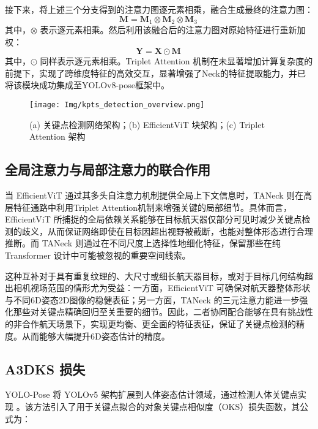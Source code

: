 接下来，将上述三个分支得到的注意力图逐元素相乘，融合生成最终的注意力图：
\begin{equation} 
	\mathbf{M} = \mathbf{M}_{1} \otimes \mathbf{M}_{2} \otimes \mathbf{M}_{3}\,
\end{equation}
其中，$\otimes$ 表示逐元素相乘。然后利用该融合后的注意力图对原始特征进行重新加权：
\begin{equation} 
	\mathbf{Y} = \mathbf{X} \odot \mathbf{M}\,
\end{equation}
其中，$\odot$ 同样表示逐元素相乘。Triplet Attention 机制在未显著增加计算复杂度的前提下，实现了跨维度特征的高效交互，显著增强了Neck的特征提取能力，并已将该模块成功集成至YOLOv8-pose框架中。

\begin{figure}[htbp]
	\centering
	\texttt{[image: Img/kpts\_detection\_overview.png]}
	\caption{(a) 关键点检测网络架构；(b) EfficientViT 块架构；(c) Triplet Attention 架构}
	\label{fig:keypoint_detection_neural_network}
	\vspace{-3ex}
\end{figure}


\subsection{全局注意力与局部注意力的联合作用}
当 EfficientViT 通过其多头自注意力机制提供全局上下文信息时，TANeck 则在高层特征通路中利用Triplet Attention机制来增强关键的局部细节。具体而言，EfficientViT 所捕捉的全局依赖关系能够在目标航天器仅部分可见时减少关键点检测的歧义，从而保证网络即使在目标因超出视野被截断，也能对整体形态进行合理推断。而 TANeck 则通过在不同尺度上选择性地细化特征，保留那些在纯 Transformer 设计中可能被忽视的重要空间线索。

这种互补对于具有重复纹理的、大尺寸或细长航天器目标，或对于目标几何结构超出相机视场范围的情形尤为受益：一方面，EfficientViT 可确保对航天器整体形状与不同6D姿态2D图像的稳健表征；另一方面，TANeck 的三元注意力能进一步强化那些对关键点精确回归至关重要的细节。因此，二者协同配合能够在具有挑战性的非合作航天场景下，实现更均衡、更全面的特征表征，保证了关键点检测的精度。从而能够大幅提升6D姿态估计的精度。
\subsection{A3DKS 损失}


YOLO-Pose 将 YOLOv5 架构扩展到人体姿态估计领域，通过检测人体关键点实现 \citep{yolo_pose}。该方法引入了用于关键点拟合的对象关键点相似度（OKS）损失函数，其公式为：

